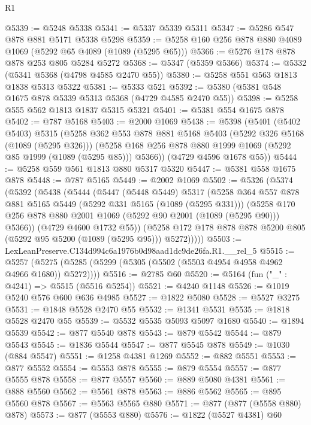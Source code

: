 \begin{lexlean}{R1}
\begin{coremodule}
@5339 := @5248 @5338
@5341 := @5337 @5339 @5311
@5347 := @5286 @547 @878 @881 @5171 @5338 @5298
@5359 := @5258 @160 @256 @878 @880 @4089 @1069 (@5292 @65 @4089 (@1089 (@5295 @65)))
@5366 := @5276 @178 @878 @878 @253 @805 @5284 @5272
@5368 := @5347 (@5359 @5366)
@5374 := @5332 (@5341 @5368 (@4798 @4585 @2470 @55))
@5380 := @5258 @551 @563 @1813 @1838 @5313 @5322
@5381 := @5333 @521
@5392 := @5380 (@5381 @548 @1675 @878 @5339 @5313 @5368 (@4729 @4585 @2470 @55))
@5398 := @5258 @555 @562 @1813 @1837 @5315 @5321
@5401 := @5381 @554 @1675 @878
@5402 := @787 @5168
@5403 := @2000 @1069
@5438 := @5398
    (@5401
      (@5402 @5403)
      @5315
      (@5258
        @362
        @553
        @878
        @881
        @5168
        @5403
        (@5292 @326 @5168 (@1089 (@5295 @326)))
        (@5258 @168 @256 @878 @880 @1999 @1069 (@5292 @85 @1999 (@1089 (@5295 @85))) @5366))
      (@4729 @4596 @1678 @55))
@5444 := @5258 @559 @561 @1813 @880 @5317 @5320
@5447 := @5381 @558 @1675 @878
@5448 := @787 @5165
@5449 := @2002 @1069
@5502 := @5326
    (@5374
      (@5392
        (@5438
          (@5444
            (@5447
              (@5448 @5449)
              @5317
              (@5258
                @364
                @557
                @878
                @881
                @5165
                @5449
                (@5292 @331 @5165 (@1089 (@5295 @331)))
                (@5258 @170 @256 @878 @880 @2001 @1069 (@5292 @90 @2001 (@1089 (@5295 @90))) @5366))
              (@4729 @4600 @1732 @55))
            (@5258 @172 @178 @878 @878 @5200 @805 (@5292 @95 @5200 (@1089 (@5295 @95))) @5272)))))
@5503 := LexLeanPreserve.C134d994c6a1976b0d98aad1dc9de26fa.R1.__rel_5
@5515 := @5257 (@5275 (@5285 (@5299 (@5305 (@5502 (@5503 @4954 @4958 @4962 @4966 @1680)) @5272))))
@5516 := @2785 @60
@5520 := @5164 (fun ("_" : @4241) => @5515 (@5516 @5254))
@5521 := @4240 @1148
@5526 := @1019 @5240 @576 @600 @636 @4985
@5527 := @1822 @5080
@5528 := @5527 @3275
@5531 := @1848 @5528 @2470 @55
@5532 := @1341 @5531
@5535 := @1818 @5528 @2470 @55
@5539 := @5532 @5535 @5093 @5097 @1680
@5540 := @1894 @5539
@5542 := @877 @5540 @878
@5543 := @879 @5542
@5544 := @879 @5543
@5545 := @1836 @5544
@5547 := @877 @5545 @878
@5549 := @1030 (@884 @5547)
@5551 := @1258 @4381 @1269
@5552 := @882 @5551
@5553 := @877 @5552
@5554 := @5553 @878
@5555 := @879 @5554
@5557 := @877 @5555 @878
@5558 := @877 @5557
@5560 := @889 @5080 @4381
@5561 := @888 @5560
@5562 := @5561 @878
@5563 := @886 @5562
@5565 := @895 @5560 @878
@5567 := @5563 @5565 @880
@5571 := @877 (@877 (@5558 @880) @878)
@5573 := @877 (@5553 @880)
@5576 := @1822 (@5527 @4381) @60

\end{coremodule}
\end{lexlean}
